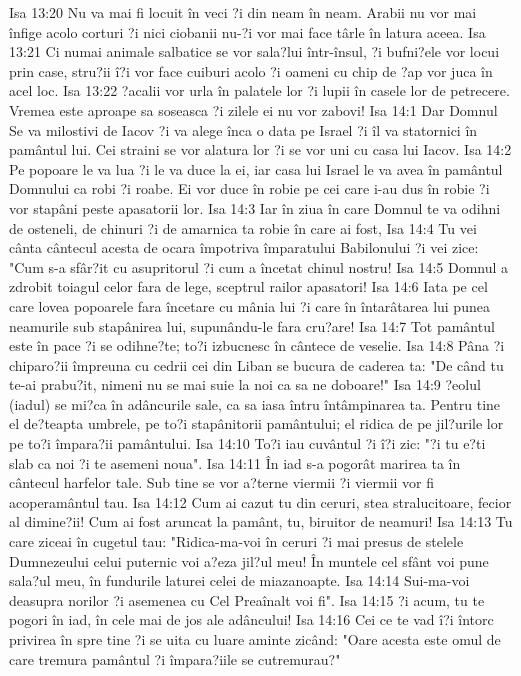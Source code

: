 Isa 13:20  Nu va mai fi locuit în veci ?i din neam în neam. Arabii nu vor mai înfige acolo corturi ?i nici ciobanii nu-?i vor mai face târle în latura aceea.
Isa 13:21  Ci numai animale salbatice se vor sala?lui într-însul, ?i bufni?ele vor locui prin case, stru?ii î?i vor face cuiburi acolo ?i oameni cu chip de ?ap vor juca în acel loc.
Isa 13:22  ?acalii vor urla în palatele lor ?i lupii în casele lor de petrecere. Vremea este aproape sa soseasca ?i zilele ei nu vor zabovi!
Isa 14:1  Dar Domnul Se va milostivi de Iacov ?i va alege înca o data pe Israel ?i îl va statornici în pamântul lui. Cei straini se vor alatura lor ?i se vor uni cu casa lui Iacov.
Isa 14:2  Pe popoare le va lua ?i le va duce la ei, iar casa lui Israel le va avea în pamântul Domnului ca robi ?i roabe. Ei vor duce în robie pe cei care i-au dus în robie ?i vor stapâni peste apasatorii lor.
Isa 14:3  Iar în ziua în care Domnul te va odihni de osteneli, de chinuri ?i de amarnica ta robie în care ai fost,
Isa 14:4  Tu vei cânta cântecul acesta de ocara împotriva împaratului Babilonului ?i vei zice: "Cum s-a sfâr?it cu asupritorul ?i cum a încetat chinul nostru!
Isa 14:5  Domnul a zdrobit toiagul celor fara de lege, sceptrul railor apasatori!
Isa 14:6  Iata pe cel care lovea popoarele fara încetare cu mânia lui ?i care în întarâtarea lui punea neamurile sub stapânirea lui, supunându-le fara cru?are!
Isa 14:7  Tot pamântul este în pace ?i se odihne?te; to?i izbucnesc în cântece de veselie.
Isa 14:8  Pâna ?i chiparo?ii împreuna cu cedrii cei din Liban se bucura de caderea ta: "De când tu te-ai prabu?it, nimeni nu se mai suie la noi ca sa ne doboare!"
Isa 14:9  ?eolul (iadul) se mi?ca în adâncurile sale, ca sa iasa întru întâmpinarea ta. Pentru tine el de?teapta umbrele, pe to?i stapânitorii pamântului; el ridica de pe jil?urile lor pe to?i împara?ii pamântului.
Isa 14:10  To?i iau cuvântul ?i î?i zic: "?i tu e?ti slab ca noi ?i te asemeni noua".
Isa 14:11  În iad s-a pogorât marirea ta în cântecul harfelor tale. Sub tine se vor a?terne viermii ?i viermii vor fi acoperamântul tau.
Isa 14:12  Cum ai cazut tu din ceruri, stea stralucitoare, fecior al dimine?ii! Cum ai fost aruncat la pamânt, tu, biruitor de neamuri!
Isa 14:13  Tu care ziceai în cugetul tau: "Ridica-ma-voi în ceruri ?i mai presus de stelele Dumnezeului celui puternic voi a?eza jil?ul meu! În muntele cel sfânt voi pune sala?ul meu, în fundurile laturei celei de miazanoapte.
Isa 14:14  Sui-ma-voi deasupra norilor ?i asemenea cu Cel Preaînalt voi fi".
Isa 14:15  ?i acum, tu te pogori în iad, în cele mai de jos ale adâncului!
Isa 14:16  Cei ce te vad î?i întorc privirea în spre tine ?i se uita cu luare aminte zicând: "Oare acesta este omul de care tremura pamântul ?i împara?iile se cutremurau?"
